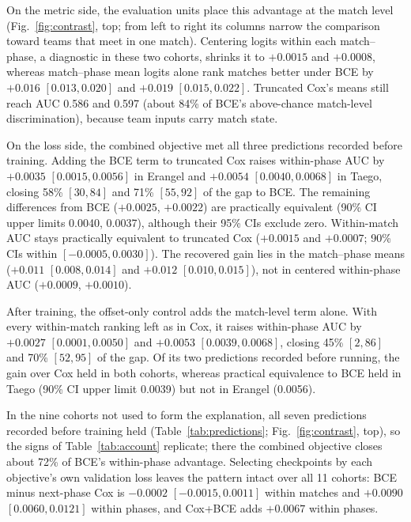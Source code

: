 \documentclass[sigconf,anonymous,nonacm]{acmart}
\begin{document}
On the metric side, the evaluation units place this advantage at the match level (Fig.~\ref{fig:contrast}, top; from left to right its columns narrow the comparison toward teams that meet in one match). Centering logits within each match--phase, a diagnostic in these two cohorts, shrinks it to $+0.0015$ and $+0.0008$, whereas match--phase mean logits alone rank matches better under BCE by $+0.016$ $[0.013,\allowbreak 0.020]$ and $+0.019$ $[0.015,\allowbreak 0.022]$. Truncated Cox's means still reach AUC 0.586 and 0.597 (about 84\% of BCE's above-chance match-level discrimination), because team inputs carry match state.

On the loss side, the combined objective met all three predictions recorded before training. Adding the BCE term to truncated Cox raises within-phase AUC by $+0.0035$ $[0.0015,\allowbreak 0.0056]$ in Erangel and $+0.0054$ $[0.0040,\allowbreak 0.0068]$ in Taego, closing 58\% $[30,\allowbreak 84]$ and 71\% $[55,\allowbreak 92]$ of the gap to BCE. The remaining differences from BCE ($+0.0025$, $+0.0022$) are practically equivalent (90\% CI upper limits 0.0040, 0.0037), although their 95\% CIs exclude zero. Within-match AUC stays practically equivalent to truncated Cox ($+0.0015$ and $+0.0007$; 90\% CIs within $[-0.0005,\allowbreak 0.0030]$). The recovered gain lies in the match--phase means ($+0.011$ $[0.008,\allowbreak 0.014]$ and $+0.012$ $[0.010,\allowbreak 0.015]$), not in centered within-phase AUC ($+0.0009$, $+0.0010$).

After training, the offset-only control adds the match-level term alone. With every within-match ranking left as in Cox, it raises within-phase AUC by $+0.0027$ $[0.0001,\allowbreak 0.0050]$ and $+0.0053$ $[0.0039,\allowbreak 0.0068]$, closing 45\% $[2,\allowbreak 86]$ and 70\% $[52,\allowbreak 95]$ of the gap. Of its two predictions recorded before running, the gain over Cox held in both cohorts, whereas practical equivalence to BCE held in Taego (90\% CI upper limit 0.0039) but not in Erangel (0.0056).


In the nine cohorts not used to form the explanation, all seven predictions recorded before training held (Table~\ref{tab:predictions}; Fig.~\ref{fig:contrast}, top), so the signs of Table~\ref{tab:account} replicate; there the combined objective closes about 72\% of BCE's within-phase advantage. Selecting checkpoints by each objective's own validation loss leaves the pattern intact over all 11 cohorts: BCE minus next-phase Cox is $-0.0002$ $[-0.0015,\allowbreak 0.0011]$ within matches and $+0.0090$ $[0.0060,\allowbreak 0.0121]$ within phases, and Cox+BCE adds $+0.0067$ within phases.
\end{document}

